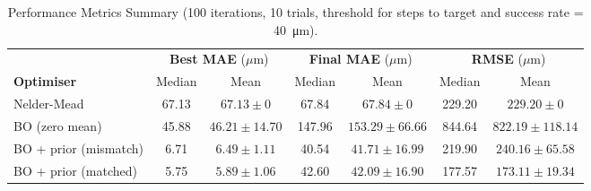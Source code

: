 
\clearpage
\begin{table}
\centering
\caption{Performance Metrics Summary (100 iterations, 10 trials, threshold for steps to target and success rate = \SI{40}{\micro\metre}).}
\label{table:results_main}
\small
\renewcommand{\arraystretch}{1.3}

\vspace{0.5em}
\begin{tabular}{l cc cc cc}
\toprule
 & \multicolumn{2}{c}{\textbf{Best MAE} ($\mu$m)}
 & \multicolumn{2}{c}{\textbf{Final MAE} ($\mu$m)}
 & \multicolumn{2}{c}{\textbf{RMSE} ($\mu$m)} \\
\cmidrule(lr){2-3} \cmidrule(lr){4-5} \cmidrule(lr){6-7}
\textbf{Optimiser} & Median & Mean & Median & Mean & Median & Mean \\
\midrule
Nelder-Mead           & 67.13 & $67.13 \pm 0$       & 67.84  & $67.84 \pm 0$        & 229.20 & $229.20 \pm 0$       \\
BO (zero mean)        & 45.88 & $46.21 \pm 14.70$   & 147.96 & $153.29 \pm 66.66$   & 844.64 & $822.19 \pm 118.14$ \\
BO + prior (mismatch) & 6.71  & $6.49 \pm 1.11$     & 40.54  & $41.71 \pm 16.99$    & 219.90 & $240.16 \pm 65.58$  \\
BO + prior (matched)  & 5.75  & $5.89 \pm 1.06$     & 42.60  & $42.09 \pm 16.90$    & 177.57 & $173.11 \pm 19.34$  \\
\bottomrule
\end{tabular}

\vspace{1.5em}


\end{table}
